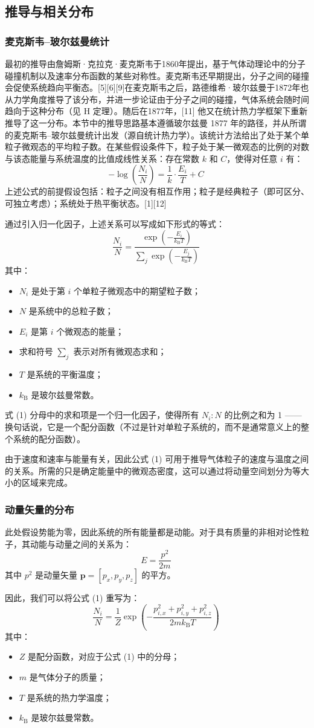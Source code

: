 \subsection{推导与相关分布}
\subsubsection{麦克斯韦–玻尔兹曼统计}
最初的推导由詹姆斯·克拉克·麦克斯韦于1860年提出，基于气体动理论中的分子碰撞机制以及速率分布函数的某些对称性。麦克斯韦还早期提出，分子之间的碰撞会促使系统趋向平衡态。[5][6][9]在麦克斯韦之后，路德维希·玻尔兹曼于1872年也从力学角度推导了该分布，并进一步论证由于分子之间的碰撞，气体系统会随时间趋向于这种分布（见 H 定理）。随后在1877年，[11] 他又在统计热力学框架下重新推导了这一分布。本节中的推导思路基本遵循玻尔兹曼 1877 年的路径，并从所谓的麦克斯韦–玻尔兹曼统计出发（源自统计热力学）。该统计方法给出了处于某个单粒子微观态的平均粒子数。在某些假设条件下，粒子处于某一微观态的比例的对数与该态能量与系统温度的比值成线性关系：存在常数 $k$ 和 $C$，使得对任意 $i$ 有：
$$
-\log\left(\frac{N_i}{N}\right) = \frac{1}{k} \cdot \frac{E_i}{T} + C~
$$
上述公式的前提假设包括：粒子之间没有相互作用；粒子是经典粒子（即可区分、可独立考虑）；系统处于热平衡状态。[1][12]

通过引入归一化因子，上述关系可以写成如下形式的等式：
$$
\frac{N_i}{N} = \frac{\exp\left( -\frac{E_i}{k_{\text{B}} T} \right)}{\sum\limits_j \exp\left( -\frac{E_j}{k_{\text{B}} T} \right)} \tag{1}~
$$
其中：
\begin{itemize}
\item $N_i$ 是处于第 $i$ 个单粒子微观态中的期望粒子数；
\item $N$ 是系统中的总粒子数；
\item $E_i$ 是第 $i$ 个微观态的能量；
\item 求和符号 $\sum_j$ 表示对所有微观态求和；
\item $T$ 是系统的平衡温度；
\item $k_{\text{B}}$ 是玻尔兹曼常数。
\end{itemize}
式 (1) 分母中的求和项是一个归一化因子，使得所有 $N_i : N$ 的比例之和为 1 —— 换句话说，它是一个配分函数（不过是针对单粒子系统的，而不是通常意义上的整个系统的配分函数）。

由于速度和速率与能量有关，因此公式 (1) 可用于推导气体粒子的速度与温度之间的关系。所需的只是确定能量中的微观态密度，这可以通过将动量空间划分为等大小的区域来完成。
\subsubsection{动量矢量的分布}
此处假设势能为零，因此系统的所有能量都是动能。对于具有质量的非相对论性粒子，其动能与动量之间的关系为：
$$
E = \frac{p^2}{2m} \tag{2}~
$$
其中 $p^2$ 是动量矢量 $\mathbf{p} = [p_x, p_y, p_z]$ 的平方。

因此，我们可以将公式 (1) 重写为：
$$
\frac{N_i}{N} = \frac{1}{Z} \exp\left( -\frac{p_{i,x}^2 + p_{i,y}^2 + p_{i,z}^2}{2m k_{\text{B}} T} \right) \tag{3}~
$$
其中：
\begin{itemize}
\item $Z$ 是配分函数，对应于公式 (1) 中的分母；
\item $m$ 是气体分子的质量；
\item $T$ 是系统的热力学温度；
\item $k_{\text{B}}$ 是玻尔兹曼常数。
\end{itemize}